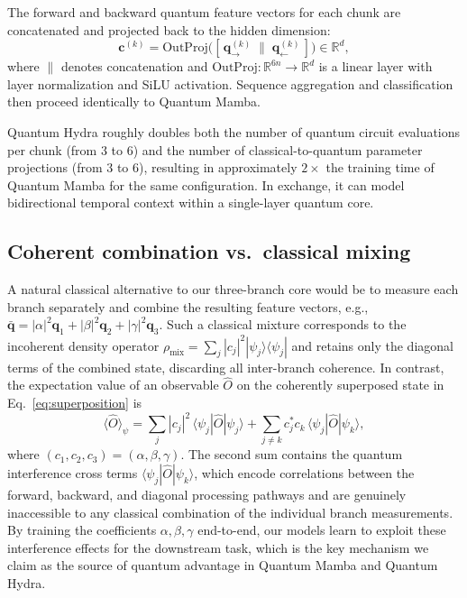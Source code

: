 The forward and backward quantum feature vectors for each chunk are concatenated and projected back to the hidden dimension:
\begin{equation}
    \mathbf{c}^{(k)} = \mathrm{OutProj}\!\Big([\,\mathbf{q}_{\rightarrow}^{(k)} \;\|\; \mathbf{q}_{\leftarrow}^{(k)}\,]\Big) \in \mathbb{R}^{d},
    \label{eq:bidir_fusion}
\end{equation}
where $\|$ denotes concatenation and $\mathrm{OutProj}: \mathbb{R}^{6n} \to \mathbb{R}^{d}$ is a linear layer with layer normalization and SiLU activation.
Sequence aggregation and classification then proceed identically to Quantum Mamba.

Quantum Hydra roughly doubles both the number of quantum circuit evaluations per chunk (from 3 to 6) and the number of classical-to-quantum parameter projections (from 3 to 6), resulting in approximately $2\times$ the training time of Quantum Mamba for the same configuration.
In exchange, it can model bidirectional temporal context within a single-layer quantum core.

\subsection{Coherent combination vs.\ classical mixing}
\label{sec:rationale}

A natural classical alternative to our three-branch core would be to measure each branch separately and combine the resulting feature vectors, e.g., $\bar{\mathbf{q}} = |\alpha|^2 \mathbf{q}_1 + |\beta|^2 \mathbf{q}_2 + |\gamma|^2 \mathbf{q}_3$.
Such a classical mixture corresponds to the incoherent density operator $\rho_{\text{mix}} = \sum_j |c_j|^2 |\psi_j\rangle\langle\psi_j|$ and retains only the diagonal terms of the combined state, discarding all inter-branch coherence.
In contrast, the expectation value of an observable $\hat{O}$ on the coherently superposed state in Eq.~\eqref{eq:superposition} is
\begin{equation}
    \langle\hat{O}\rangle_{\psi} = \sum_{j} |c_j|^2\, \langle\psi_j|\hat{O}|\psi_j\rangle + \sum_{j \neq k} c_j^{*} c_k\, \langle\psi_j|\hat{O}|\psi_k\rangle,
    \label{eq:interference}
\end{equation}
where $(c_1, c_2, c_3) = (\alpha, \beta, \gamma)$.
The second sum contains the quantum interference cross terms $\langle\psi_j|\hat{O}|\psi_k\rangle$, which encode correlations between the forward, backward, and diagonal processing pathways and are genuinely inaccessible to any classical combination of the individual branch measurements.
By training the coefficients $\alpha, \beta, \gamma$ end-to-end, our models learn to exploit these interference effects for the downstream task, which is the key mechanism we claim as the source of quantum advantage in Quantum Mamba and Quantum Hydra.
